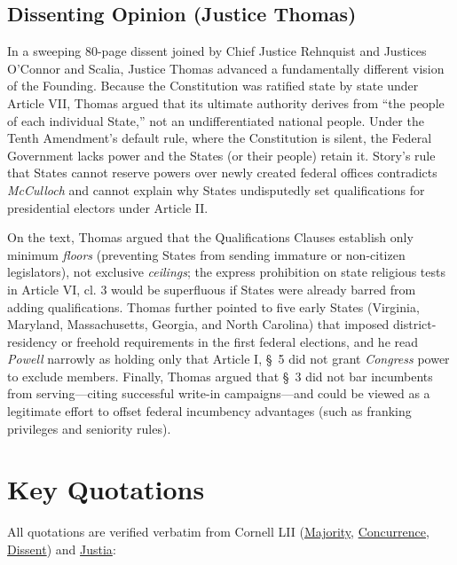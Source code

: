 \documentclass[12pt]{article}
\begin{document}
\subsection{Dissenting Opinion (Justice Thomas)}
In a sweeping 80-page dissent joined by Chief Justice Rehnquist and Justices O'Connor and Scalia, Justice Thomas advanced a fundamentally different vision of the Founding. Because the Constitution was ratified state by state under Article VII, Thomas argued that its ultimate authority derives from ``the people of each individual State,'' not an undifferentiated national people. Under the Tenth Amendment's default rule, where the Constitution is silent, the Federal Government lacks power and the States (or their people) retain it. Story's rule that States cannot reserve powers over newly created federal offices contradicts \textit{McCulloch} and cannot explain why States undisputedly set qualifications for presidential electors under Article II.

On the text, Thomas argued that the Qualifications Clauses establish only minimum \textit{floors} (preventing States from sending immature or non-citizen legislators), not exclusive \textit{ceilings}; the express prohibition on state religious tests in Article VI, cl. 3 would be superfluous if States were already barred from adding qualifications. Thomas further pointed to five early States (Virginia, Maryland, Massachusetts, Georgia, and North Carolina) that imposed district-residency or freehold requirements in the first federal elections, and he read \textit{Powell} narrowly as holding only that Article I, \S~5 did not grant \textit{Congress} power to exclude members. Finally, Thomas argued that \S~3 did not bar incumbents from serving---citing successful write-in campaigns---and could be viewed as a legitimate effort to offset federal incumbency advantages (such as franking privileges and seniority rules).

\section{Key Quotations}

All quotations are verified verbatim from Cornell LII (\href{https://www.law.cornell.edu/supct/html/93-1456.ZO.html}{Majority}, \href{https://www.law.cornell.edu/supct/html/93-1456.ZC.html}{Concurrence}, \href{https://www.law.cornell.edu/supct/html/93-1456.ZD.html}{Dissent}) and \href{https://supreme.justia.com/cases/federal/us/514/779/}{Justia}:
\end{document}

